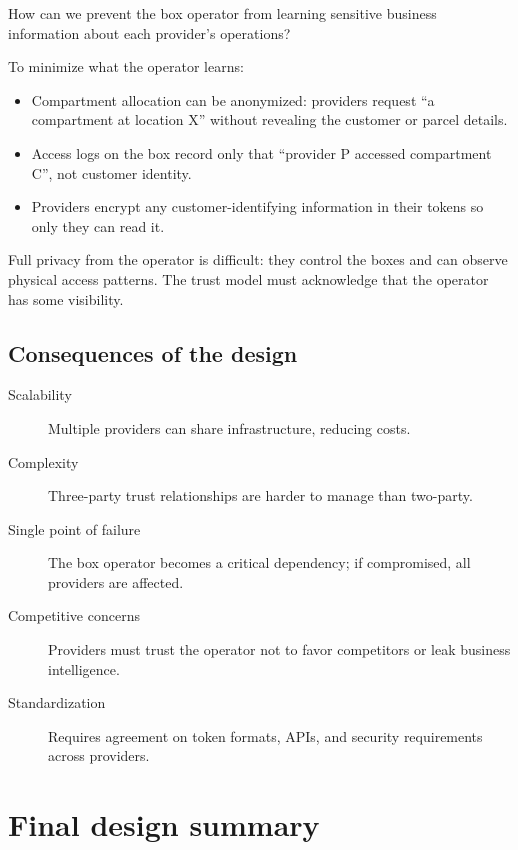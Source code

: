 \begin{exercise}
  How can we prevent the box operator from learning sensitive business 
  information about each provider's operations?
\end{exercise}

To minimize what the operator learns:
\begin{itemize}
  \item Compartment allocation can be anonymized: providers request 
    \enquote{a compartment at location X} without revealing the customer or 
    parcel details.
  \item Access logs on the box record only that \enquote{provider P accessed 
    compartment C}, not customer identity.
  \item Providers encrypt any customer-identifying information in their tokens 
    so only they can read it.
\end{itemize}

Full privacy from the operator is difficult: they control the boxes and can 
observe physical access patterns.
The trust model must acknowledge that the operator has some visibility.

\subsection{Consequences of the design}

\begin{description}
  \item[Scalability] Multiple providers can share infrastructure, reducing 
    costs.
  \item[Complexity] Three-party trust relationships are harder to manage than 
    two-party.
  \item[Single point of failure] The box operator becomes a critical 
    dependency; if compromised, all providers are affected.
  \item[Competitive concerns] Providers must trust the operator not to favor 
    competitors or leak business intelligence.
  \item[Standardization] Requires agreement on token formats, APIs, and 
    security requirements across providers.
\end{description}


\section{Final design summary}

